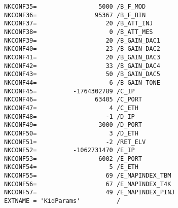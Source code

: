 \documentclass[a4paper,10pt]{article}
\begin{document}
\begin{verbatim}
NKCONF35=                 5000 /B_F_MOD
NKCONF36=                95367 /B_F_BIN
NKCONF37=                   20 /B_ATT_INJ
NKCONF38=                    0 /B_ATT_MES
NKCONF39=                   20 /B_GAIN_DAC1
NKCONF40=                   23 /B_GAIN_DAC2
NKCONF41=                   20 /B_GAIN_DAC3
NKCONF42=                   33 /B_GAIN_DAC4
NKCONF43=                   50 /B_GAIN_DAC5
NKCONF44=                    6 /B_GAIN_TONE
NKCONF45=          -1764302789 /C_IP
NKCONF46=                63405 /C_PORT
NKCONF47=                    4 /C_ETH
NKCONF48=                   -1 /D_IP
NKCONF49=                 3000 /D_PORT
NKCONF50=                    3 /D_ETH
NKCONF51=                   -2 /RET_ELV
NKCONF52=          -1062731470 /E_IP
NKCONF53=                 6002 /E_PORT
NKCONF54=                    5 /E_ETH
NKCONF55=                   69 /E_MAPINDEX_TBM
NKCONF56=                   67 /E_MAPINDEX_T4K
NKCONF57=                   49 /E_MAPINDEX_PINJ
EXTNAME = 'KidParams'          /
\end{verbatim}


\end{document}
